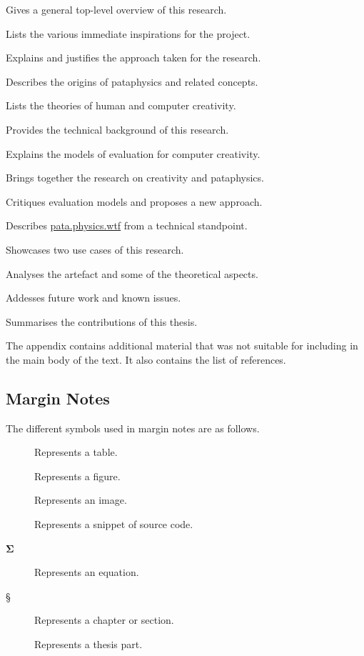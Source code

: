 \begin{description}[leftmargin=3.5cm]
  \item[Introduction] Gives a general top-level overview of this research.
  \item[Inspirations] Lists the various immediate inspirations for the project.
  \item[Methodology] Explains and justifies the approach taken for the research.
  \item[Pataphysics] Describes the origins of pataphysics and related concepts. 
  \item[Creativity] Lists the theories of human and computer creativity.
  \item[Technology] Provides the technical background of this research.
  \item[Evaluation] Explains the models of evaluation for computer creativity.
  \item[Foundations] Brings together the research on creativity and pataphysics.
  \item[Interpretation] Critiques evaluation models and proposes a new approach.
  \item[Implementation] Describes \url{pata.physics.wtf} from a technical standpoint.
  \item[Applications] Showcases two use cases of this research.
  \item[Patanalysis] Analyses the artefact and some of the theoretical aspects. 
  \item[Asprirations] Addesses future work and known issues.
  \item[Outroduction] Summarises the contributions of this thesis.
\end{description}

The appendix contains additional material that was not suitable for including in the main body of the text. It also contains the list of references.


\subsection{Margin Notes}

The different symbols used in margin notes are as follows.

\begin{description}
  \item [] Represents a table.
  \item [] Represents a figure.
  \item [] Represents an image.
  \item [] Represents a snippet of source code.
  \item [$\bm{\Sigma}$] Represents an equation.
  \item [§] Represents a chapter or section.
  \item [\textspiral] Represents a thesis part.
\end{description}


